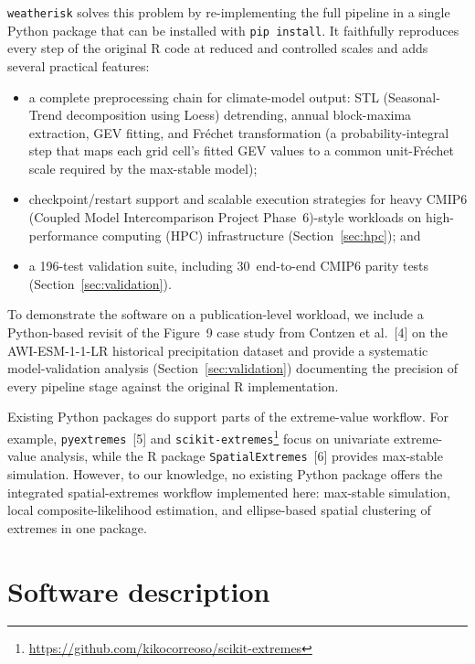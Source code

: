 \documentclass[preprint,12pt,a4paper]{elsarticle}
\newcommand{\rev}[1]{{#1}}
\newcommand{\revb}[1]{{\color{RevisionBlue}#1}}
\newcommand{\revo}[1]{{\color{RevisionOrange}#1}}
\begin{document}
\texttt{weatherisk} solves this problem by re-implementing the full
pipeline in a single Python package that can be installed with
\texttt{pip install}.  It faithfully reproduces every step of the
original R code at reduced and controlled scales and adds several
practical features:
\begin{itemize}
\item \rev{a complete preprocessing chain for climate-model output:
  STL (Seasonal-Trend decomposition using Loess) detrending, annual
  block-maxima extraction, GEV fitting, and Fr\'{e}chet transformation
  (a probability-integral step that maps each grid cell's fitted GEV
  values to a common unit-Fr\'{e}chet scale required by the max-stable
  model)};
\item \rev{checkpoint/restart support and scalable execution
  strategies for heavy CMIP6\revo{ (Coupled Model Intercomparison
  Project Phase~6)}-style workloads on high-performance
  computing (HPC) infrastructure (Section~\ref{sec:hpc})}; and
\item \rev{a 196-test validation suite, including 30~end-to-end
  CMIP6 parity tests (Section~\ref{sec:validation})}.
\end{itemize}

\rev{To demonstrate the software on a publication-level workload, we
include a \revb{Python-based revisit of the Figure~9 case study} from Contzen et al.~[4] on the
AWI-ESM-1-1-LR historical precipitation dataset and provide a
systematic model-validation analysis (Section~\ref{sec:validation})
documenting the precision of every pipeline stage against the original
R implementation.}

Existing Python packages do support parts of the extreme-value workflow.
For example, \texttt{pyextremes}~[5] and
\texttt{scikit-extremes}\footnote{\url{https://github.com/kikocorreoso/scikit-extremes}}
focus on univariate extreme-value analysis, while the R package
\texttt{SpatialExtremes}~[6] provides max-stable simulation.
However, to our knowledge, no existing Python package offers the
integrated spatial-extremes workflow implemented here: max-stable
simulation, local composite-likelihood estimation, and ellipse-based
spatial clustering of extremes in one package.

\section{Software description}
\label{sec:description}
\end{document}
